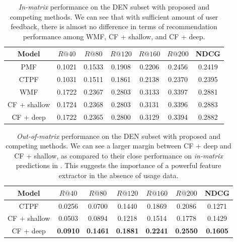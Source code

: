 \begin{table}
\centering
  \begin{tabular}{ c  c  c  c  c c   c  }
    \toprule
    Model & $R@40$  & $R@80$  & $R@120$  & $R@160$ & $R@200$ & NDCG \\ \midrule
     \gls{PMF} \citep{Gopalan:2015} & 0.1021 & 0.1533 &  0.1908 & 0.2206 & 0.2456 & 0.2419 \\
     \gls{CTPF} \citep{gopalan2014content} &  0.1031 & 0.1511  & 0.1861  & 0.2138  & 0.2370 & 0.2395 \\
     \gls{WMF} \citep{hu2008collaborative} & 0.1722  &  0.2367 & 0.2803 & 0.3133 & 0.3397 & 0.2881 \\
     CF + shallow & 0.1724 & 0.2368 & 0.2803 & 0.3131 & 0.3396 & 0.2883\\
     CF + deep & {0.1722} & {0.2365} & {0.2800} & {0.3129} & {0.3394} & {0.2882} \\
    \bottomrule
  \end{tabular}
  \caption{\emph{In-matrix} performance on the DEN subset with proposed and competing methods. We can see that with sufficient amount of user feedback, there is almost no difference in terms of recommendation performance among \gls{WMF}, CF + shallow, and CF + deep.} 
  \label{tab:in-matrix}
\end{table}

\begin{table}
\centering
  \begin{tabular}{ c  c  c  c  c c   c  }
    \toprule
    Model & $R@40$  & $R@80$  & $R@120$  & $R@160$ & $R@200$ & NDCG \\ \midrule
     \gls{CTPF} \citep{gopalan2014content} &  0.0256 &  0.0700  &  0.1440  & 0.1869  &  0.2086 & 0.1271 \\
     CF + shallow & 0.0503 & 0.0894 & 0.1218 & 0.1514 & 0.1778 & 0.1429\\
     CF + deep & \bf{0.0910} & \bf{0.1461} & \bf{0.1881} & \bf{0.2241} & \bf{0.2550} & \bf{0.1605} \\
    \bottomrule
  \end{tabular}
  \caption{\emph{Out-of-matrix} performance on the DEN subset with proposed and competing methods. We can see a larger margin between CF + deep and CF + shallow, as compared to their close performance on \emph{in-matrix} predictions in . This suggests the importance of a powerful feature extractor in the absence of usage data. } 
  \label{tab:out-matrix}
\end{table}

